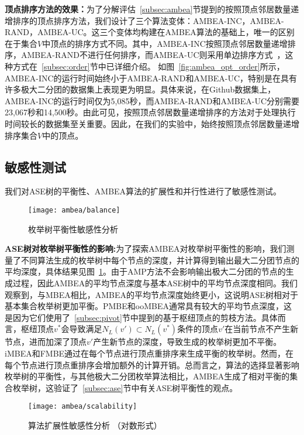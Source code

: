 \textbf{顶点排序方法的效果：}为了分解评估~\ref{subsec:ambea}节提到的按照顶点邻居数量递增排序的顶点排序方法，我们设计了三个算法变体：AMBEA-INC，AMBEA-RAND，AMBEA-UC。这三个变体均构建在AMBEA算法的基础上，唯一的区别在于集合$V$中顶点的排序方式不同。其中，AMBEA-INC按照顶点邻居数量递增排序，AMBEA-RAND不进行任何排序，而AMBEA-UC则采用单边排序方式~\cite{ooMBE22}，这种方式在~\ref{subsec:order}节中已详细介绍。
如图~\ref{fig:ambea_opt_order}所示，AMBEA-INC的运行时间始终小于AMBEA-RAND和AMBEA-UC，特别是在具有许多极大二分团的数据集上表现更为明显。具体来说，在Github数据集上，AMBEA-INC的运行时间仅为5,085秒，而AMBEA-RAND和AMBEA-UC分别需要23,067秒和14,500秒。由此可见，按照顶点邻居数量递增排序的方法对于处理执行时间较长的数据集至关重要。因此，在我们的实验中，始终按照顶点邻居数量递增排序集合$V$中的顶点。


\subsection{敏感性测试}

我们对ASE树的平衡性、AMBEA算法的扩展性和并行性进行了敏感性测试。

\begin{figure} [H]
	\centering
	\texttt{[image: ambea/balance]}
	\caption{枚举树平衡性敏感性分析}
	\label{fig:ambea_exp_balance}
\end{figure}

\textbf{ASE树对枚举树平衡性的影响:}为了探索AMBEA对枚举树平衡性的影响，我们测量了不同算法生成的枚举树中每个节点的深度，并计算得到输出最大二分团节点的平均深度，具体结果见图~\ref{fig:ambea_exp_balance}。由于AMP方法不会影响输出极大二分团的节点的生成过程，因此AMBEA的平均节点深度与基本ASE树中的平均节点深度相同。我们观察到，与MBEA相比，AMBEA的平均节点深度始终更小，这说明ASE树相对于基本集合枚举树更加平衡。PMBE和ooMBEA通常具有较大的平均节点深度，这是因为它们使用了~\ref{subsec:pivot}节中提到的基于枢纽顶点的剪枝方法。具体而言，枢纽顶点$v^*$会导致满足$N_L(v')\subset N_L(v^*)$条件的顶点$v'$在当前节点不产生新节点，进而加深了顶点$v'$产生新节点的深度，导致生成的枚举树更加不平衡。iMBEA和FMBE通过在每个节点进行顶点重排序来生成平衡的枚举树。然而，在每个节点进行顶点重排序会增加额外的计算开销。总而言之，算法的选择显著影响枚举树的平衡性，与其他极大二分团枚举算法相比，AMBEA生成了相对平衡的集合枚举树，这验证了~\ref{subsec:ase}节中有关ASE树平衡性的观点。

\begin{figure} [H]
	\centering
	\texttt{[image: ambea/scalability]}
	\caption{算法扩展性敏感性分析 （对数形式）}
	\label{fig:ambea_exp_scalability}
\end{figure}


